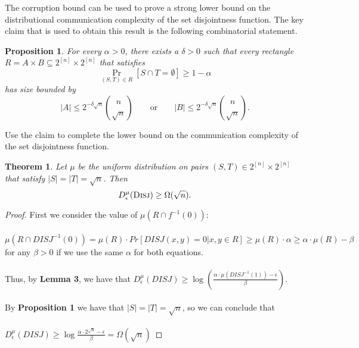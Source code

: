 \documentclass[11pt,oneside]{book}
\theoremstyle{plain}
\newtheorem{theorem}{Theorem}
\newtheorem{proposition}{Proposition}
\theoremstyle{definition}
\theoremstyle{plain}
\begin{document}
The corruption bound can be used to prove a strong lower bound on the distributional communication complexity of the set disjointness function. The key claim that is used to obtain this result is the following combinatorial statement.

\begin{proposition}
	For every $\alpha>0$, there exists a $\delta>0$ such that every rectangle $R = A \times B \subseteq 2^{[n]} \times 2^{[n]}$
	that satisfies 
	\[
	\Pr_{(S,T) \in R}[ S \cap T = \emptyset ] \ge 1-\alpha
	\]
	has size bounded by
	\[
	|A| \le 2^{-\delta \sqrt{n}} \binom{n}{\sqrt{n}}
	\qquad \mbox{or} \qquad
	|B| \le 2^{-\delta \sqrt{n}} \binom{n}{\sqrt{n}}.
	\]
\end{proposition}

Use the claim to complete the lower bound on the communication complexity of the set disjointness function.

\begin{theorem}
	Let $\mu$ be the uniform distribution on pairs $(S,T) \in 2^{[n]} \times 2^{[n]}$ that satisfy $|S| = |T| = \sqrt{n}$. Then
	\[
	D_\epsilon^{\mu}(\textsc{Disj}) \ge \Omega(\sqrt{n}).
	\]
\end{theorem}

\begin{proof}
	First we consider the value of $\mu(R \cap f^{-1}(0))$:\\
	\\
	$\mu(R \cap DISJ^{-1}(0)) = \mu(R) \cdot Pr[DISJ(x,y) = 0|x,y \in R] \ge \mu(R) \cdot \alpha \ge \alpha \cdot \mu(R) - \beta$ for any $\beta > 0$ if we use the same $\alpha$ for both equations.\\
	\\
	Thus, by \textbf{Lemma 3}, we have that $D^\mu_\epsilon(DISJ) \ge \log\left( \frac{\alpha \cdot \mu(DISJ^{-1}(1)) - \epsilon}{\beta}\right)$.\\ 
	\\
	By \textbf{Proposition 1} we have that $|S| = |T| = \sqrt{n}$, so we can conclude that \\
	\\
	$D^\mu_\epsilon(DISJ) \ge \log \frac{\alpha \cdot 2^{\sqrt{n}} - \epsilon}{\beta} = \Omega(\sqrt{n})$
\end{proof}

	
\end{document}
